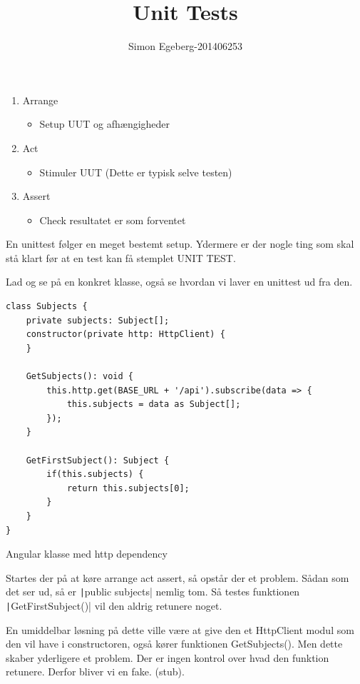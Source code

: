\documentclass{article}
\title{Unit Tests}
\author{Simon Egeberg-201406253}
\begin{document}
\maketitle
\begin{enumerate}
	\item Arrange
	\begin{itemize}
		\item Setup UUT og afhængigheder
	\end{itemize}
	\item Act
	\begin{itemize}
		\item Stimuler UUT (Dette er typisk selve testen)
	\end{itemize}
	\item Assert
	\begin{itemize}
		\item Check resultatet er som forventet
	\end{itemize}
\end{enumerate}
En unittest følger en meget bestemt setup. Ydermere er der nogle ting som skal stå klart før at en test kan få stemplet UNIT TEST.\

Lad og se på en konkret klasse, også se hvordan vi laver en unittest ud fra den.
\begin{listing}[H]
\begin{verbatim}
class Subjects {
	private subjects: Subject[];
	constructor(private http: HttpClient) {
	}

	GetSubjects(): void {
		this.http.get(BASE_URL + '/api').subscribe(data => {
			this.subjects = data as Subject[];
		});
	}

	GetFirstSubject(): Subject {
		if(this.subjects) {
			return this.subjects[0];
		}
	}
}
\end{verbatim}
\caption{Angular klasse med http dependency}
\end{listing}

Startes der på at køre arrange act assert, så opstår der et problem. Sådan som det ser ud, så er \texttt|public subjects| nemlig tom. Så testes funktionen  \texttt|GetFirstSubject()| vil den aldrig retunere noget. 

En umiddelbar løsning på dette  ville være at give den et HttpClient modul som den vil have i constructoren, også kører funktionen GetSubjects(). Men dette skaber yderligere et problem. Der er ingen kontrol over hvad den funktion retunere. Derfor bliver vi en fake. (stub). 
\end{document}
